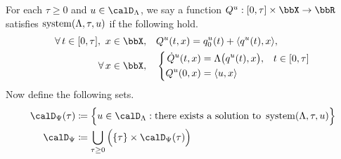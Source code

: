 \begin{definition}
  \label{definition:momentSpace}
  For each $\tau \geq 0$ and $\momentVar \in \odeSpace$, we say a function $Q^\momentVar: [0,\tau] \times \stateSpace \rightarrow \bbR$ satisfies $\operatorname{system}(\Lambda, \tau,u)$ if the following hold.
  \begin{equation}
    \label{eq:riccati-system}
    \begin{aligned}
      \forall\, t \in [0,\tau], ~ \stateVar \in \stateSpace, \quad
      & Q^\momentVar(t, \stateVar) = q_0^\momentVar(t) + \prj{q^\momentVar(t)}{\stateVar},  \\
      \forall\, \stateVar \in \stateSpace, \quad
      & \left\{\begin{aligned}
        \dot Q^\momentVar(t, \stateVar) &= \ode\big(q^\momentVar(t), \stateVar\big), & t \in [0,\tau] \\
        Q^\momentVar(0, \stateVar) &= \prj{\momentVar}{\stateVar}
      \end{aligned}\right.
    \end{aligned}
  \end{equation}
  Now define the following sets.
  \begin{align*}
    \momentSpace(\tau) &\defeq \Big\{ \momentVar \in \odeSpace : \text{there exists a solution to } \system(\ode,\tau,\momentVar) \Big\} \\
    \momentSpace &\defeq \bigcup_{\tau\geq 0} \Big( \{\tau\} \times \momentSpace(\tau) \Big)
  \end{align*}
\end{definition}
